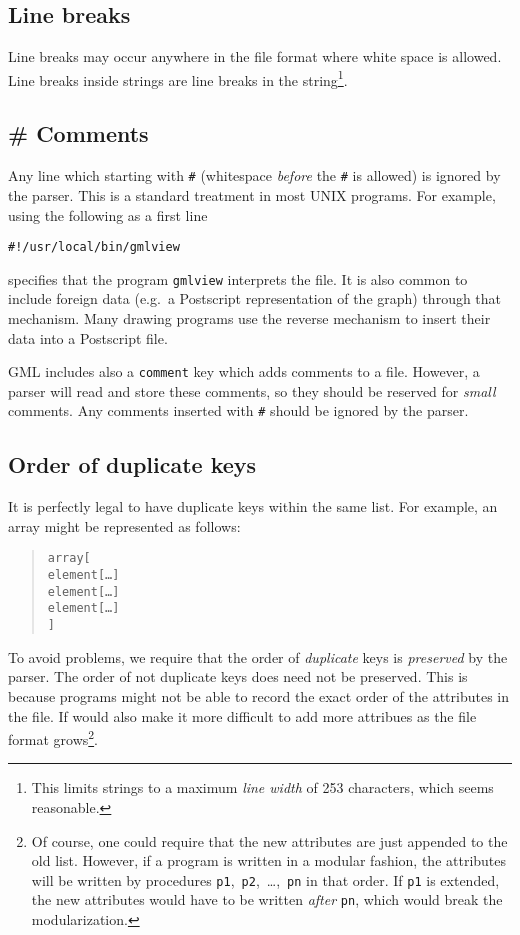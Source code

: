 \subsection{Line breaks}
Line breaks may occur anywhere in the file format where white
space is allowed. Line breaks inside strings are line breaks in
the string\footnote{This limits strings to a maximum \emph{line
    width} of 253 characters, which seems reasonable.}.

\subsection{\# Comments}
Any line which starting with \verb|#| (whitespace \emph{before}
the \verb|#| is allowed) is ignored by the parser.  This is a
standard treatment in most UNIX programs.  For example, using the
following as a first line

\begin{alltt}
#!/usr/local/bin/gmlview
\end{alltt}

\noindent specifies that the program \texttt{gmlview} interprets the file.
It is also common to include foreign data (e.g.\ a Postscript
representation of the graph) through that mechanism. Many drawing
programs use the reverse mechanism to insert their data into a
Postscript file.

GML includes also a \texttt{comment} key which adds comments to a
file. However, a parser will read and store these comments, so
they should be reserved for \emph{small} comments. Any comments
inserted with \texttt{\#} should be ignored by the parser.

\subsection{Order of duplicate keys}
\label{s:GML:OrderOfDupliactekeys}
It is perfectly legal to have duplicate keys within the same
list.  For example, an array might be represented as follows:

\begin{quote}
\begin{alltt}
array [
    element [ {\textnormal{\ldots{}}} ]
    element [ {\textnormal{\ldots{}}} ]
    element [ {\textnormal{\ldots{}}} ]
]
\end{alltt}
\end{quote}

\noindent To avoid problems, we require that the order of \emph{duplicate}
keys is \emph{preserved} by the parser. The order of not
duplicate keys does need not be preserved. This is because
programs might not be able to record the exact order of the
attributes in the file. If would also make it more difficult to
add more attribues as the file format grows\footnote{Of course,
  one could require that the new attributes are just appended to
  the old list. However, if a program is written in a modular
  fashion, the attributes will be written by procedures
  \mbox{\texttt{p1}, \texttt{p2}, \ldots, \texttt{pn}} in that
  order. If \texttt{p1} is extended, the new attributes would
  have to be written \emph{after} \texttt{pn}, which would break
  the modularization.}.

